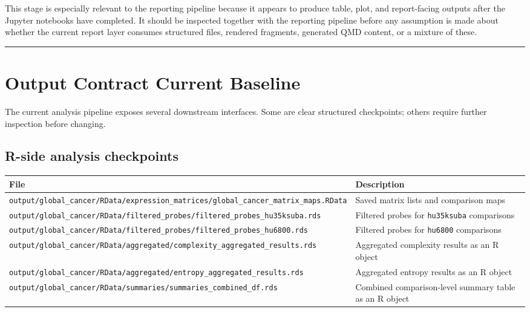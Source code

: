\documentclass[
  letterpaper,
  DIV=11,
  numbers=noendperiod,
  openany,
  oneside]{scrreprt}
\begin{document}
This stage is especially relevant to the reporting pipeline because it
appears to produce table, plot, and report-facing outputs after the
Jupyter notebooks have completed. It should be inspected together with
the reporting pipeline before any assumption is made about whether the
current report layer consumes structured files, rendered fragments,
generated QMD content, or a mixture of these.

\begin{center}\rule{0.5\linewidth}{0.5pt}\end{center}

\section*{Output Contract Current
Baseline}\label{output-contract-current-baseline}


The current analysis pipeline exposes several downstream interfaces.
Some are clear structured checkpoints; others require further inspection
before changing.

\subsection*{R-side analysis
checkpoints}\label{r-side-analysis-checkpoints}

\begin{longtable}[]{@{}
  >{\raggedright\arraybackslash}p{}
  >{\raggedright\arraybackslash}p{}@{}}
\toprule\noalign{}
\begin{minipage}[b]{\linewidth}\raggedright
File
\end{minipage} & \begin{minipage}[b]{\linewidth}\raggedright
Description
\end{minipage} \\
\midrule\noalign{}
\endhead
\bottomrule\noalign{}
\endlastfoot
\texttt{output/global\_cancer/RData/expression\_matrices/global\_cancer\_matrix\_maps.RData}
& Saved matrix lists and comparison maps \\
\texttt{output/global\_cancer/RData/filtered\_probes/filtered\_probes\_hu35ksuba.rds}
& Filtered probes for \texttt{hu35ksuba} comparisons \\
\texttt{output/global\_cancer/RData/filtered\_probes/filtered\_probes\_hu6800.rds}
& Filtered probes for \texttt{hu6800} comparisons \\
\texttt{output/global\_cancer/RData/aggregated/complexity\_aggregated\_results.rds}
& Aggregated complexity results as an R object \\
\texttt{output/global\_cancer/RData/aggregated/entropy\_aggregated\_results.rds}
& Aggregated entropy results as an R object \\
\texttt{output/global\_cancer/RData/summaries/summaries\_combined\_df.rds}
& Combined comparison-level summary table as an R object \\
\end{longtable}
\end{document}
